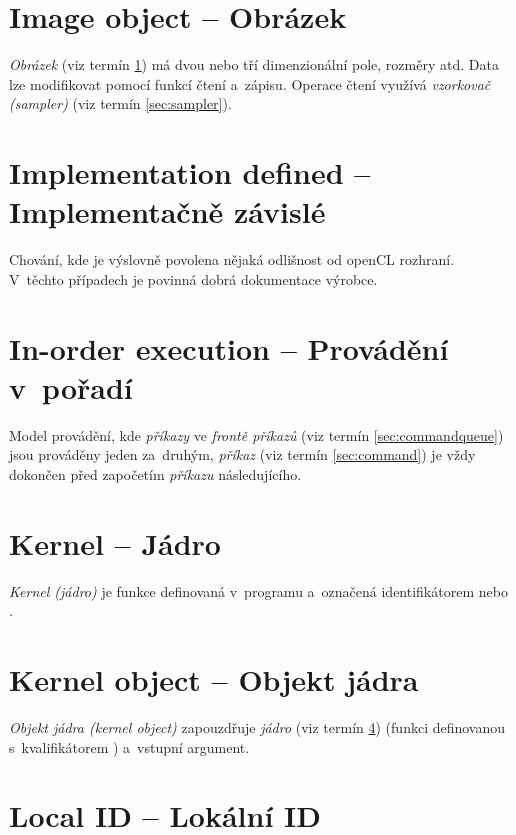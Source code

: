 \section{Image object -- Obrázek}
\label{sec:imageobject}

\emph{Obrázek} (viz termín \ref{sec:imageobject}) má dvou nebo tří dimenzionální pole, rozměry atd. Data lze modifikovat pomocí funkcí čtení a~zápisu. Operace čtení využívá \emph{vzorkovač (sampler)} (viz termín \ref{sec:sampler}).

\section{Implementation defined -- Implementačně závislé}
\label{sec:implementationdefined}

Chování, kde je výslovně povolena nějaká odlišnost od openCL rozhraní. V~těchto případech je povinná dobrá dokumentace výrobce.

\section{In-order execution -- Provádění v~pořadí}
\label{sec:inorderexecution}

Model provádění, kde \emph{příkazy} ve \emph{frontě příkazů} (viz termín \ref{sec:commandqueue}) jsou prováděny jeden za~druhým, 
\emph{příkaz} (viz termín \ref{sec:command}) je vždy dokončen před započetím \emph{příkazu} následujícího.

\section{Kernel -- Jádro}
\label{sec:kernel}

\emph{Kernel (jádro)} je funkce definovaná v~programu
a~označená identifikátorem  nebo .

\section{Kernel object -- Objekt jádra}
\label{sec:kernelobject}

\emph{Objekt jádra (kernel object)} zapouzdřuje \emph{jádro} (viz termín \ref{sec:kernel}) (funkci definovanou s~kvalifikátorem ) a~vstupní argument.

\section{Local ID -- Lokální ID}
\label{sec:localid}

